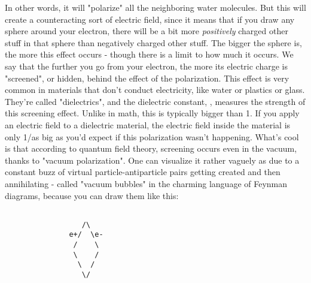 In other words, it will "polarize" all the neighboring water molecules.
But this will create a counteracting sort of electric field, since it
means that if you draw any sphere around your electron, there will be a
bit more \emph{positively} charged other stuff in that sphere than negatively
charged other stuff.  The bigger the sphere is, the more this effect
occurs - though there is a limit to how much it occurs.  We say that
the further you go from your electron, the more its electric charge is
"screened", or hidden, behind the effect of the polarization.
This effect is very common in materials that don't conduct electricity,
like water or plastics or glass.  They're called "dielectrics", and the
dielectric constant, \epsilon , measures the strength of this screening
effect.  Unlike in math, this \epsilon  is typically bigger than 1.  If
you apply an electric field to a dielectric material, the electric field
inside the material is only 1/\epsilon  as big as you'd expect if this
polarization wasn't happening.  
What's cool is that according to quantum field theory, screening occurs
even in the vacuum, thanks to "vacuum polarization".  One can visualize
it rather vaguely as due to a constant buzz of virtual particle-antiparticle
pairs getting created and then annihilating - called "vacuum bubbles"
in the charming language of Feynman diagrams, because you can draw them
like this:
\begin{verbatim}

                  /\
               e+/  \e-
                /    \
                \    /
                 \  /
                  \/

\end{verbatim}
    
